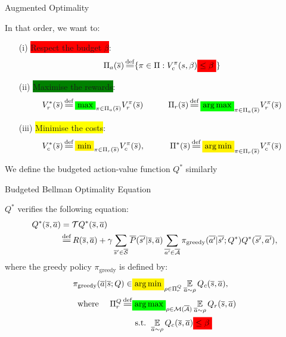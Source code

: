 \documentclass{beamer}
\newcommand{\mathcolorbox}[2]{\colorbox{#1}{$\displaystyle #2$}}
\begin{document}
    \begin{frame}{Augmented Optimality}
        \begin{definition}In that order, we want to:
\begin{enumerate}
    \item[(i)] \pause\colorbox{red}{Respect the budget $\beta$}: 
    \begin{equation*}
    \Pi_a(\os) \eqdef \{\pi\in\Pi: V_c^\pi(s, \beta) \mathcolorbox{red}{\leq \beta}\}
    \end{equation*}
    \item[(ii)] \pause\colorbox{green}{Maximise the rewards}:
    \begin{equation*}
        V_r^*(\os) \eqdef \mathcolorbox{green}{\max}_{\pi\in\Pi_a(\os)}  V_r^\pi(\os) \qquad\quad \Pi_r(\os) \eqdef \mathcolorbox{green}{\argmax}_{\pi\in\Pi_a(\os)}  V_r^\pi(\os)
    \end{equation*}
    \item[(iii)] \pause\colorbox{yellow}{Minimise the costs}: 
    \begin{equation*}
        V_c^*(\os) \eqdef \mathcolorbox{yellow}{\min}_{\pi\in\Pi_r(\os)}  V_c^\pi(\os), \qquad\quad \Pi^*(\os) \eqdef \mathcolorbox{yellow}{\argmin}_{\pi\in\Pi_r(\os)}  V_c^\pi(\os)
    \end{equation*}
\end{enumerate}

\pause We define the budgeted action-value function $Q^*$ similarly
\end{definition}
    \end{frame}

    \begin{frame}{Budgeted Bellman Optimality Equation}
        \begin{theorem}
            $Q^*$ verifies the following equation:
            \begin{align*}
                Q^{*}(\os, \oa) &= \cT Q^{*}(\os, \oa)\\
                &\eqdef R(\os, \oa) + \gamma \sum_{\os'\in\ocS} \ov{P}(\ov{s'} | \os, \oa)\sum_{\ov{a'}\in \ocA} \pi_\text{greedy}(\ov{a'}|\ov{s'}; Q^*) Q^{*}(\ov{s'}, \ov{a'}),
            \end{align*}
            where the greedy policy $\pi_\text{greedy}$ is defined by:
            \begin{align*}
                \pi_\text{greedy}(\oa|\os; Q) \in &\mathcolorbox{yellow}{\argmin}_{\rho\in\Pi_r^Q} \expectedvalueover{\oa\sim\rho}Q_c(\os, \oa), \\
                \text{where }\quad \Pi_r^Q \eqdef &\mathcolorbox{green}{\argmax}_{\rho\in\cM(\ocA)} \expectedvalueover{\oa\sim\rho} Q_r(\os, \oa) \\
                & \text{ s.t. }  \expectedvalueover{\oa\sim\rho} Q_c(\os, \oa) \mathcolorbox{red}{\leq \beta}
            \end{align*}
        \end{theorem}
    \end{frame}
\end{document}
